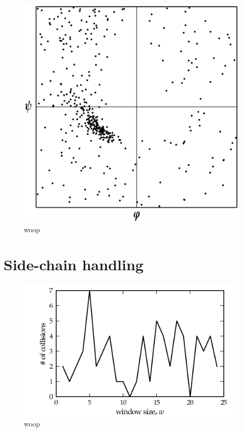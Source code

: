 \begin{figure}
	\centering
	\includegraphics[width=0.9\columnwidth]{figures/plot_ramachandran}
	\caption{woop}
\end{figure}


\section{Side-chain handling}
\begin{figure}
	\centering
	\hspace*{-3.5mm}\includegraphics[width=1.1\columnwidth]{figures/plot_collisions}
	\caption{woop}
\end{figure}




